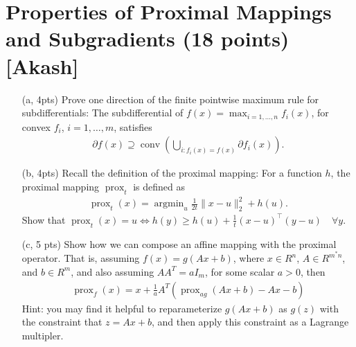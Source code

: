 \documentclass{article}
\theoremstyle{remark}
\theoremstyle{definition}
\newcommand{\argmin}{\mathop{\mathrm{argmin}}}
\newcommand{\prox}{\operatorname{prox}}
\begin{document}
\section{Properties of Proximal Mappings and Subgradients (18 points) [Akash]}
\begin{enumerate}

    \item[(a, 4pts)] Prove one direction of the finite pointwise maximum rule
      for subdifferentials: The subdifferential of $f(x) = \max_{i=1,\dots, n}
      f_i(x)$, for convex $f_i$, $i=1,\ldots,m$, satisfies
        \begin{align}
            \partial f(x) \supseteq \operatorname{conv}\left( \bigcup_{i : f_i(x) = f(x)} \partial f_i(x)  \right).
        \end{align}

    \item[(b, 4pts)] Recall the definition of the proximal mapping: For a function $h$, the proximal mapping $\prox_t$ is defined as
        \begin{align}
            \prox_t(x) = \argmin_{u} \frac{1}{2t} \| x-u\|_2^2 + h(u).
        \end{align}
 Show that $\prox_t(x) = u \Leftrightarrow h(y) \geq h(u) + \frac 1 t (x - u)^\top (y - u) \quad \forall y$.

    \item[(c, 5 pts)] Show how we can compose an affine mapping with the proximal operator. That is, assuming $f(x) = g(Ax + b)$, where $x \in R^n$, $A \in R^{m^*n}$, and $b \in R^m$, and also assuming $AA^T = aI_m$, for some scalar $a>0$, then
        \begin{align}
            \prox_{f}(x) = x + \frac{1}{a} A^T \left(\prox_{a g}(Ax+b) - Ax - b \right)
        \end{align}
    Hint: you may find it helpful to reparameterize $g(Ax + b)$ as $g(z)$ with the constraint that $z = Ax + b$, and then apply this constraint as a Lagrange multipler.  


\end{enumerate}
\end{document}
